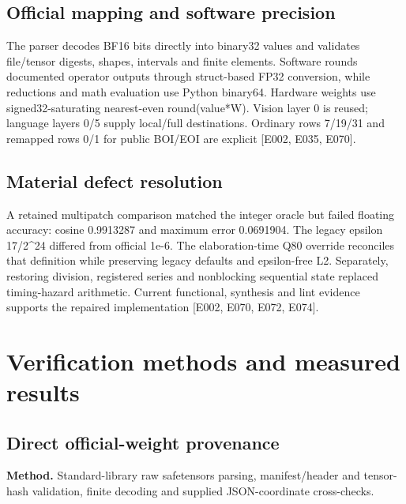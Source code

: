 \documentclass[11pt,a4paper]{article}
\begin{document}
\subsection{Official mapping and software precision}

The parser decodes BF16 bits directly into binary32 values and validates file/\allowbreak{}tensor digests,\allowbreak{} shapes,\allowbreak{} intervals and finite elements. Software rounds documented operator outputs through struct-based FP32 conversion,\allowbreak{} while reductions and math evaluation use Python binary64. Hardware weights use signed32-saturating nearest-even round(\allowbreak{}value*\allowbreak{}W)\allowbreak{}. Vision layer 0 is reused; language layers 0/\allowbreak{}5 supply local/\allowbreak{}full destinations. Ordinary rows 7/\allowbreak{}19/\allowbreak{}31 and remapped rows 0/\allowbreak{}1 for public BOI/\allowbreak{}EOI are explicit [\allowbreak{}E002,\allowbreak{} E035,\allowbreak{} E070]\allowbreak{}.

\subsection{Material defect resolution}

A retained multipatch comparison matched the integer oracle but failed floating accuracy: cosine 0.9913287 and maximum error 0.0691904. The legacy epsilon 17/\allowbreak{}2\textasciicircum{}24 differed from official 1e-6. The elaboration-time Q80 override reconciles that definition while preserving legacy defaults and epsilon-free L2. Separately,\allowbreak{} restoring division,\allowbreak{} registered series and nonblocking sequential state replaced timing-hazard arithmetic. Current functional,\allowbreak{} synthesis and lint evidence supports the repaired implementation [\allowbreak{}E002,\allowbreak{} E070,\allowbreak{} E072,\allowbreak{} E074]\allowbreak{}.

\section{Verification methods and measured results}

\subsection{Direct official-weight provenance}

\textbf{Method.} Standard-library raw safetensors parsing,\allowbreak{} manifest/\allowbreak{}header and tensor-hash validation,\allowbreak{} finite decoding and supplied JSON-coordinate cross-checks.
\end{document}
